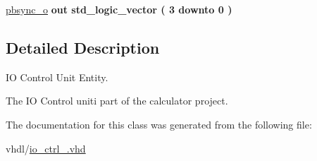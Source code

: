 \begin{DoxyCompactItemize}
\item 
\mbox{\label{classio__ctrl_a95d4164acb4876609c3ee30095deba32}} 
\hyperlink{classio__ctrl_a95d4164acb4876609c3ee30095deba32}{pbsync\+\_\+o}  {\bfseries {\bfseries \textcolor{vhdlchar}{out}\textcolor{vhdlchar}{ }}} {\bfseries \textcolor{vhdlchar}{std\+\_\+logic\+\_\+vector}\textcolor{vhdlchar}{ }\textcolor{vhdlchar}{(}\textcolor{vhdlchar}{ }\textcolor{vhdlchar}{ } \textcolor{vhdldigit}{3} \textcolor{vhdlchar}{ }\textcolor{vhdlchar}{downto}\textcolor{vhdlchar}{ }\textcolor{vhdlchar}{ } \textcolor{vhdldigit}{0} \textcolor{vhdlchar}{ }\textcolor{vhdlchar}{)}\textcolor{vhdlchar}{ }} 
\end{DoxyCompactItemize}


\subsection{Detailed Description}
IO Control Unit Entity. 

The IO Control uniti part of the calculator project. 

The documentation for this class was generated from the following file\+:\begin{DoxyCompactItemize}
\item 
vhdl/\hyperlink{io__ctrl___8vhd}{io\+\_\+ctrl\+\_\+.\+vhd}\end{DoxyCompactItemize}
